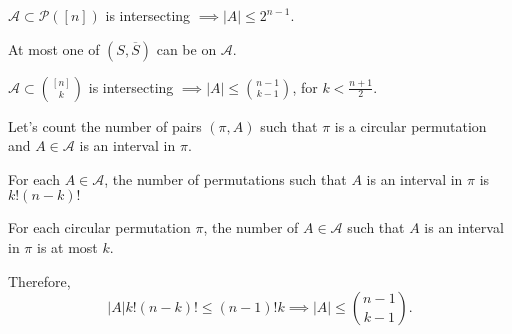 \begin{prop}
	$\mathcal{A} \subset \mathcal{P}([n])$ is intersecting $\implies |A| \le 2^{n-1}$.
\end{prop}

\begin{sk}
	At most one of $(S, \overline{S})$ can be on $\mathcal{A}$.
\end{sk}

\begin{thm}[Erd\H{o}s-Ko=Rado, 1961]
	$\mathcal{A} \subset \binom{[n]}{k}$ is intersecting $\implies |A| \le \binom{n-1}{k-1}$, for $k < \frac{n+1}{2}$.
\end{thm}

\begin{dem}
	Let's count the number of pairs $(\pi, A)$ such that $\pi$ is a circular permutation and $A \in \mathcal{A}$ is an interval in $\pi$.

	For each $A \in \mathcal{A}$, the number of permutations such that $A$ is an interval in $\pi$ is $k!(n-k)!$

	For each circular permutation $\pi$, the number of $A \in \mathcal{A}$ such that $A$ is an interval in $\pi$ is at most $k$.

	Therefore, \[
		|A|k!(n-k)! \le (n-1)!k
		\implies
		|A| \le \binom{n-1}{k-1}.
	\]
\end{dem}
